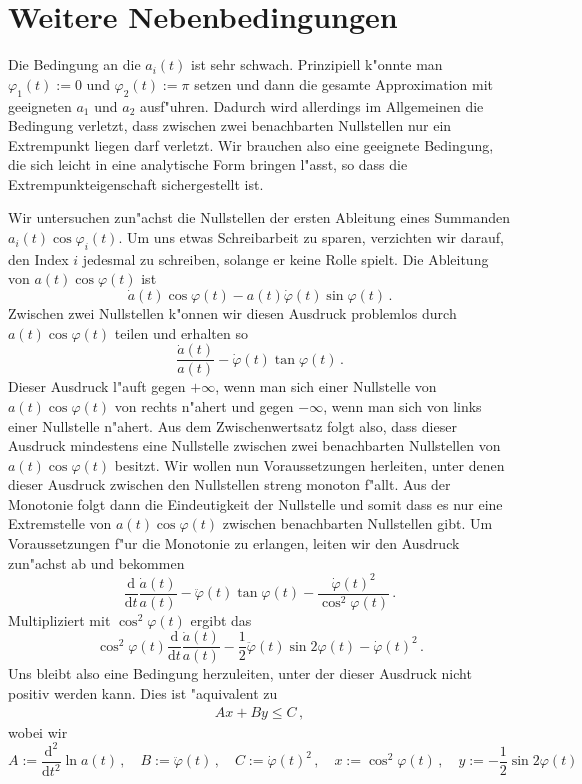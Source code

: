 \documentclass[a4paper]{scrartcl}
\newcommand{\de}{{\mathrm{d}}}
\newcommand{\pphi}{{\varphi}}
\begin{document}
\section{Weitere Nebenbedingungen} \label{sec:moreconds}

Die Bedingung an die $a_i(t)$ ist sehr schwach. 
Prinzipiell k"onnte man $\pphi_1(t):=0$ und $\pphi_2(t):=\pi$ setzen und dann die gesamte Approximation mit geeigneten $a_1$ und $a_2$ ausf"uhren. 
Dadurch wird allerdings im Allgemeinen die Bedingung verletzt, dass zwischen zwei benachbarten Nullstellen nur ein Extrempunkt liegen darf verletzt. 
Wir brauchen also eine geeignete Bedingung, die sich leicht in eine analytische Form bringen l"asst, so dass die Extrempunkteigenschaft sichergestellt ist. 

Wir untersuchen zun"achst die Nullstellen der ersten Ableitung eines Summanden $a_i(t)\cos\pphi_i(t)$. 
Um uns etwas Schreibarbeit zu sparen, verzichten wir darauf, den Index $i$ jedesmal zu schreiben, solange er keine Rolle spielt. 
Die Ableitung von $a(t)\cos\pphi(t)$ ist
$$ \dot a(t)\cos\pphi(t)-a(t)\dot\pphi(t)\sin\pphi(t)\,. $$
Zwischen zwei Nullstellen k"onnen wir diesen Ausdruck problemlos durch $a(t)\cos\pphi(t)$ teilen und erhalten so
$$ \frac{\dot a(t)}{a(t)}
-\dot\pphi(t)\tan\pphi(t)\,. $$
Dieser Ausdruck l"auft gegen $+\infty$, wenn man sich einer Nullstelle von $a(t)\cos\pphi(t)$ von rechts n"ahert und gegen $-\infty$, wenn man sich von links einer Nullstelle n"ahert. 
Aus dem Zwischenwertsatz folgt also, dass dieser Ausdruck mindestens eine Nullstelle zwischen zwei benachbarten Nullstellen von $a(t)\cos\pphi(t)$ besitzt. 
Wir wollen nun Voraussetzungen herleiten, unter denen dieser Ausdruck zwischen den Nullstellen streng monoton f"allt. 
Aus der Monotonie folgt dann die Eindeutigkeit der Nullstelle und somit dass es nur eine Extremstelle von $a(t)\cos\pphi(t)$ zwischen benachbarten Nullstellen gibt. 
Um Voraussetzungen f"ur die Monotonie zu erlangen, leiten wir den Ausdruck zun"achst ab und bekommen
$$ \frac{\de}{\de t}\frac{\dot a(t)}{a(t)}
-\ddot\pphi(t)\tan\pphi(t)
-\frac{\dot\pphi(t)^2}{\cos^2\pphi(t)}\,. $$
Multipliziert mit $\cos^2\pphi(t)$ ergibt das
$$ \cos^2\pphi(t)\frac{\de}{\de t}\frac{\dot a(t)}{a(t)}
-\frac12\ddot\pphi(t)\sin 2\pphi(t)
-\dot\pphi(t)^2\,. $$
Uns bleibt also eine Bedingung herzuleiten, unter der dieser Ausdruck nicht positiv werden kann. 
Dies ist "aquivalent zu
\begin{align} \label{eq:AxByC}
  Ax + By \le C\,,
\end{align}
wobei wir 
$$ 
A:=\frac{\de^2}{\de t^2}\ln a(t)\,, \quad
B:=\ddot\pphi(t)\,, \quad
C:=\dot\pphi(t)^2\,, \quad
x:=\cos^2\pphi(t)\,, \quad
y:=-\frac12\sin2\pphi(t) $$
\end{document}
